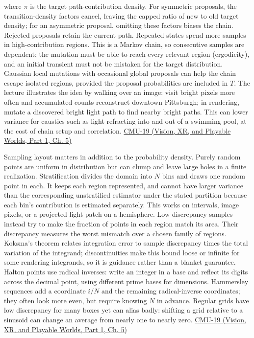 where \(\pi\) is the target path-contribution density. For symmetric proposals, the transition-density factors cancel, leaving the capped ratio of new to old target density; for an asymmetric proposal, omitting these factors biases the chain. Rejected proposals retain the current path. Repeated states spend more samples in high-contribution regions. This is a Markov chain, so consecutive samples are dependent; the mutation must be able to reach every relevant region (ergodicity), and an initial transient must not be mistaken for the target distribution. Gaussian local mutations with occasional global proposals can help the chain escape isolated regions, provided the proposal probabilities are included in \(T\). The lecture illustrates the idea by walking over an image: visit bright pixels more often and accumulated counts reconstruct downtown Pittsburgh; in rendering, mutate a discovered bright light path to find nearby bright paths. This can lower variance for caustics such as light refracting into and out of a swimming pool, at the cost of chain setup and correlation. \href{../07-Vision-XR-and-Playable-Worlds-P01/main.pdf\#04-visual-computing-ii-ch036-cmu-19---variance-reduction}{CMU-19 (Vision, XR, and Playable Worlds, Part 1, Ch. 5)}

Sampling layout matters in addition to the probability density. Purely random points are uniform in distribution but can clump and leave large holes in a finite realization. Stratification divides the domain into \(N\) bins and draws one random point in each. It keeps each region represented, and cannot have larger variance than the corresponding unstratified estimator under the stated partition because each bin's contribution is estimated separately. This works on intervals, image pixels, or a projected light patch on a hemisphere. Low-discrepancy samples instead try to make the fraction of points in each region match its area. Their discrepancy measures the worst mismatch over a chosen family of regions. Koksma's theorem relates integration error to sample discrepancy times the total variation of the integrand; discontinuities make this bound loose or infinite for some rendering integrands, so it is guidance rather than a blanket guarantee. Halton points use radical inverses: write an integer in a base and reflect its digits across the decimal point, using different prime bases for dimensions. Hammersley sequences add a coordinate \(i/N\) and the remaining radical-inverse coordinates; they often look more even, but require knowing \(N\) in advance. Regular grids have low discrepancy for many boxes yet can alias badly: shifting a grid relative to a sinusoid can change an average from nearly one to nearly zero. \href{../07-Vision-XR-and-Playable-Worlds-P01/main.pdf\#04-visual-computing-ii-ch036-cmu-19---variance-reduction}{CMU-19 (Vision, XR, and Playable Worlds, Part 1, Ch. 5)}


